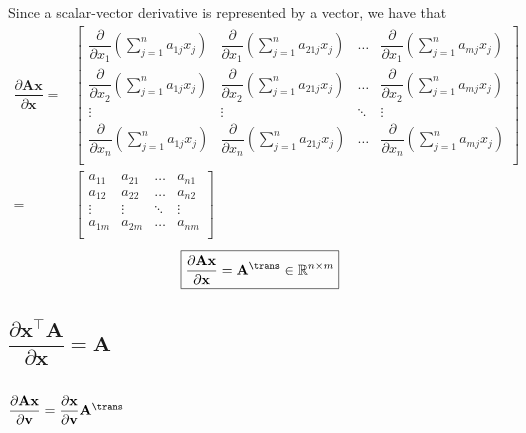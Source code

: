 Since a scalar-vector derivative is represented by a vector, we have that
\begin{align}
    \dfrac{\partial \mathbf{A} \mathbf{x}}{\partial \mathbf{x}} = & \begin{bmatrix}
        \dfrac{\partial}{\partial x_1} \left( \sum_{j = 1}^n a_{1j}x_j \right) & 
        \dfrac{\partial}{\partial x_1} \left( \sum_{j = 1}^n a_{21j}x_j \right) & 
        \dots & 
        \dfrac{\partial}{\partial x_1} \left( \sum_{j = 1}^n a_{mj}x_j \right) \\
        \dfrac{\partial}{\partial x_2} \left( \sum_{j = 1}^n a_{1j}x_j \right) & 
        \dfrac{\partial}{\partial x_2} \left( \sum_{j = 1}^n a_{21j}x_j \right) & 
        \dots & 
        \dfrac{\partial}{\partial x_2} \left( \sum_{j = 1}^n a_{mj}x_j \right) \\
        \vdots & \vdots & \ddots & \vdots \\
        \dfrac{\partial}{\partial x_n} \left( \sum_{j = 1}^n a_{1j}x_j \right) & 
        \dfrac{\partial}{\partial x_n} \left( \sum_{j = 1}^n a_{21j}x_j \right) & 
        \dots & 
        \dfrac{\partial}{\partial x_n} \left( \sum_{j = 1}^n a_{mj}x_j \right) \\
    \end{bmatrix}  \\
    = & \begin{bmatrix}
        a_{11} & a_{21} & \dots & a_{n1} \\
        a_{12} & a_{22} & \dots & a_{n2} \\
        \vdots & \vdots & \ddots & \vdots \\
        a_{1m} & a_{2m} & \dots & a_{nm} \\
    \end{bmatrix}
\end{align}
\begin{align}
    \label{eq:lt-slution}
    \boxed{\dfrac{\partial \mathbf{A} \mathbf{x}}{\partial \mathbf{x}} = \mathbf{A}^\trans \in \mathbb{R}^{n\times m}}
\end{align}

\subsection{\(\dfrac{\partial \mathbf{x}^\top\mathbf{A}}{\partial \mathbf{x}} = \mathbf{A}\)}

\subsection{\(\dfrac{\partial \mathbf{A}  \mathbf{x}}{\partial \mathbf{v}} = \dfrac{\partial \mathbf{x}}{\partial \mathbf{v}} \mathbf{A}^\trans\)}


